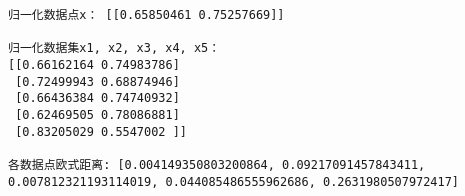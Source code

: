 \documentclass[11pt]{article}
\begin{document}
    \begin{Verbatim}[commandchars=\\\{\}]
归一化数据点x： [[0.65850461 0.75257669]]

归一化数据集x1, x2, x3, x4, x5：
[[0.66162164 0.74983786]
 [0.72499943 0.68874946]
 [0.66436384 0.74740932]
 [0.62469505 0.78086881]
 [0.83205029 0.5547002 ]]

各数据点欧式距离: [0.004149350803200864, 0.09217091457843411, 0.007812321193114019, 0.044085486555962686, 0.2631980507972417]

    \end{Verbatim}





    
\end{document}
